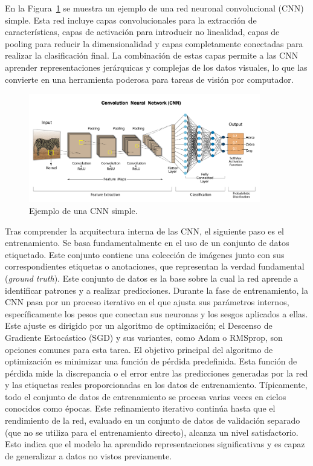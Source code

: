 \documentclass[11pt,spanish,listoffigures,listoftables]{tfgetsinf}
\begin{document}
En la Figura~\ref{fig:cnn_example}\cite{devbreachCNN} se muestra un ejemplo de una red neuronal convolucional (CNN) simple. Esta red incluye capas convolucionales para la extracción de características, capas de activación para introducir no linealidad, capas de pooling para reducir la dimensionalidad y capas completamente conectadas para realizar la clasificación final. La combinación de estas capas permite a las CNN aprender representaciones jerárquicas y complejas de los datos visuales, lo que las convierte en una herramienta poderosa para tareas de visión por computador.

\begin{figure}[H]
   \centering
   \includegraphics[width=0.9\textwidth]{images/estado_del_arte/cnn_example.png}
   \caption{Ejemplo de una CNN simple.}
   \label{fig:cnn_example}
\end{figure}


Tras comprender la arquitectura interna de las CNN, el siguiente paso es el entrenamiento. Se basa fundamentalmente en el uso de un conjunto de datos etiquetado. Este conjunto contiene una colección de imágenes junto con sus correspondientes etiquetas o anotaciones, que representan la verdad fundamental (\textit{ground truth}). Este conjunto de datos es la base sobre la cual la red aprende a identificar patrones y a realizar predicciones. Durante la fase de entrenamiento, la CNN pasa por un proceso iterativo en el que ajusta sus parámetros internos, específicamente los pesos que conectan sus neuronas y los sesgos aplicados a ellas. Este ajuste es dirigido por un algoritmo de optimización; el Descenso de Gradiente Estocástico (SGD) y sus variantes, como Adam o RMSprop, son opciones comunes para esta tarea. El objetivo principal del algoritmo de optimización es minimizar una función de pérdida predefinida. Esta función de pérdida mide la discrepancia o el error entre las predicciones generadas por la red y las etiquetas reales proporcionadas en los datos de entrenamiento. Típicamente, todo el conjunto de datos de entrenamiento se procesa varias veces en ciclos conocidos como épocas. Este refinamiento iterativo continúa hasta que el rendimiento de la red, evaluado en un conjunto de datos de validación separado (que no se utiliza para el entrenamiento directo), alcanza un nivel satisfactorio. Esto indica que el modelo ha aprendido representaciones significativas y es capaz de generalizar a datos no vistos previamente.
\end{document}
